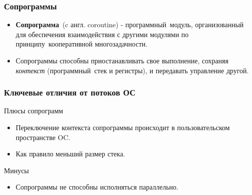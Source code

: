 
\begin{frame}%
	\titlepage
\end{frame}

\begin{frame}
	\frametitle{Сопрограммы}
	\begin{itemize}
		\item \textbf{Сопрограмма} (c англ. coroutine) - программный модуль, организованный для обеспечения взаимодействия с другими модулями по принципу кооперативной многозадачности.
		
		\item Сопрограммы способны приостанавливать свое выполнение, сохраняя \textit{контекст} (программный стек и регистры), и передавать управление другой.
	\end{itemize}
\end{frame}

\begin{frame}
	\frametitle{Ключевые отличия от потоков ОС}
	Плюсы сопрограмм
	\begin{itemize}
		\item Переключение контекста сопрограммы происходит в пользовательском пространстве OC.
		\item Как правило меньший размер стека.
	\end{itemize}

	Минусы
	\begin{itemize}
		\item Сопрограммы не способны исполняться параллельно.
	\end{itemize}
\end{frame}

